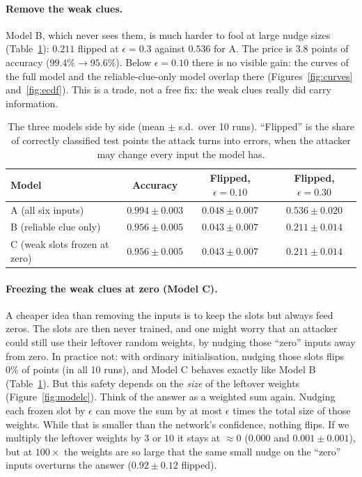 \documentclass[11pt]{article}
\begin{document}
\paragraph{Remove the weak clues.} Model B, which never sees them, is much harder to fool at large nudge sizes (Table~\ref{tab:models}): $0.211$ flipped at $\epsilon=0.3$ against $0.536$ for A. The price is $3.8$ points of accuracy ($99.4\%\to95.6\%$). Below $\epsilon=0.10$ there is no visible gain: the curves of the full model and the reliable-clue-only model overlap there (Figures~\ref{fig:curves} and~\ref{fig:ecdf}). This is a trade, not a free fix: the weak clues really did carry information.

\begin{table}[H]
\centering
\caption{The three models side by side (mean $\pm$ s.d.\ over 10 runs). ``Flipped'' is the share of correctly classified test points the attack turns into errors, when the attacker may change every input the model has.}
\label{tab:models}
\begin{tabular}{lccc}
\toprule
Model & Accuracy & Flipped, $\epsilon=0.10$ & Flipped, $\epsilon=0.30$ \\
\midrule
A (all six inputs) & $0.994\pm0.003$ & $0.048\pm0.007$ & $0.536\pm0.020$ \\
B (reliable clue only) & $0.956\pm0.005$ & $0.043\pm0.007$ & $0.211\pm0.014$ \\
C (weak slots frozen at zero) & $0.956\pm0.005$ & $0.043\pm0.007$ & $0.211\pm0.014$ \\
\bottomrule
\end{tabular}
\end{table}

\paragraph{Freezing the weak clues at zero (Model C).} A cheaper idea than removing the inputs is to keep the slots but always feed zeros. The slots are then never trained, and one might worry that an attacker could still use their leftover random weights, by nudging those ``zero'' inputs away from zero. In practice not: with ordinary initialisation, nudging those slots flips $0\%$ of points (in all 10 runs), and Model C behaves exactly like Model B (Table~\ref{tab:models}).
But this safety depends on the \emph{size} of the leftover weights (Figure~\ref{fig:modelc}). Think of the answer as a weighted sum again. Nudging each frozen slot by $\epsilon$ can move the sum by at most $\epsilon$ times the total size of those weights. While that is smaller than the network's confidence, nothing flips. If we multiply the leftover weights by $3$ or $10$ it stays at $\approx0$ ($0.000$ and $0.001\pm0.001$), but at $100\times$ the weights are so large that the same small nudge on the ``zero'' inputs overturns the answer ($0.92\pm0.12$ flipped).
\end{document}
